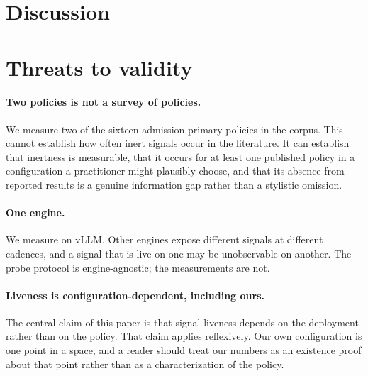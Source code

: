 
\section{Discussion}
\label{sec:discussion}


\section{Threats to validity}
\label{sec:threats}

\paragraph{Two policies is not a survey of policies.} We measure two of the
sixteen admission-primary policies in the corpus. This cannot establish how
often inert signals occur in the literature. It can establish that inertness is
measurable, that it occurs for at least one published policy in a configuration
a practitioner might plausibly choose, and that its absence from reported
results is a genuine information gap rather than a stylistic omission.

\paragraph{One engine.} We measure on vLLM. Other engines expose different
signals at different cadences, and a signal that is live on one may be
unobservable on another. The probe protocol is engine-agnostic; the measurements
are not.

\paragraph{Liveness is configuration-dependent, including ours.} The central
claim of this paper is that signal liveness depends on the deployment rather
than on the policy. That claim applies reflexively. Our own configuration is one
point in a space, and a reader should treat our numbers as an existence proof
about that point rather than as a characterization of the policy.

